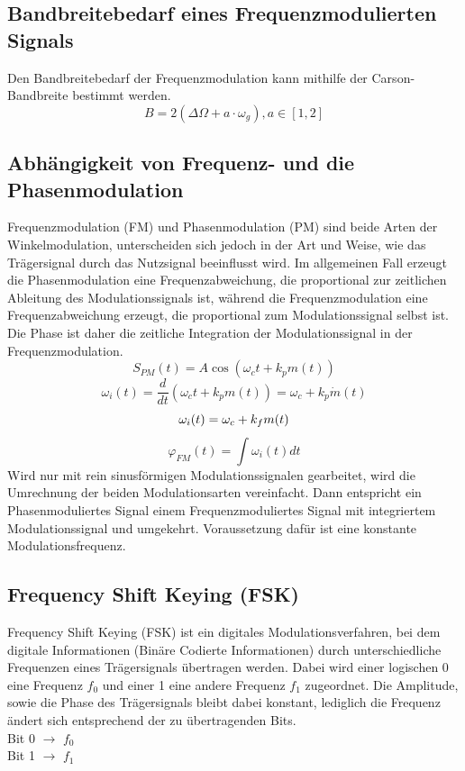 \documentclass[12pt]{scrartcl}
\begin{document}
\subsection{Bandbreitebedarf eines Frequenzmodulierten Signals}\label{sec:Carson}
Den Bandbreitebedarf der Frequenzmodulation kann mithilfe der Carson-Bandbreite bestimmt werden.
\begin{equation}
    B = 2(\Delta\Omega+a\cdot\omega_g) , a \in [1,2]
\end{equation}



\subsection{Abhängigkeit von Frequenz- und die Phasenmodulation}

Frequenzmodulation (FM) und Phasenmodulation (PM) sind beide Arten der Winkelmodulation, unterscheiden sich jedoch in der Art und Weise, wie das Trägersignal durch das Nutzsignal beeinflusst wird.
Im allgemeinen Fall erzeugt die Phasenmodulation eine Frequenzabweichung, die proportional zur zeitlichen Ableitung des Modulationssignals ist, während die Frequenzmodulation eine Frequenzabweichung erzeugt, die proportional zum Modulationssignal selbst ist. 
Die Phase ist daher die zeitliche Integration der Modulationssignal in der Frequenzmodulation. 
\begin{equation}
        S_{PM}(t) = A \cos(\omega_c t + k_p m(t))
\end{equation}
\begin{equation}
        \omega_i(t) = \frac{d}{dt}\left(\omega_c t + k_p m(t)\right) = \omega_c + k_p \dot{m}(t)
\end{equation}
\begin{equation}
    \omega_i(t) = \omega_c + k_f m(t)\\
\end{equation}
\begin{equation}
        \varphi_{FM}(t) = \int \omega_i(t) dt 
\end{equation}
Wird nur mit rein sinusförmigen Modulationssignalen gearbeitet, wird die Umrechnung der beiden Modulationsarten vereinfacht. 
Dann entspricht ein Phasenmoduliertes Signal einem Frequenzmoduliertes Signal mit integriertem Modulationssignal und umgekehrt.
Voraussetzung dafür ist eine konstante Modulationsfrequenz.

\subsection{Frequency Shift Keying (FSK)}
Frequency Shift Keying (FSK) ist ein digitales Modulationsverfahren, bei dem digitale Informationen (Binäre Codierte Informationen) durch unterschiedliche Frequenzen eines Trägersignals übertragen werden. Dabei wird einer logischen 0 eine Frequenz $f_0$ und einer 1 eine andere Frequenz $f_1$ zugeordnet. Die Amplitude, sowie die Phase des Trägersignals bleibt dabei konstant, lediglich die Frequenz ändert sich entsprechend der zu übertragenden Bits.\cite{GoldenbaumGitskript} \\
Bit 0 $\to$ $f_0$ \\
Bit 1 $\to$ $f_1$\\
\end{document}
